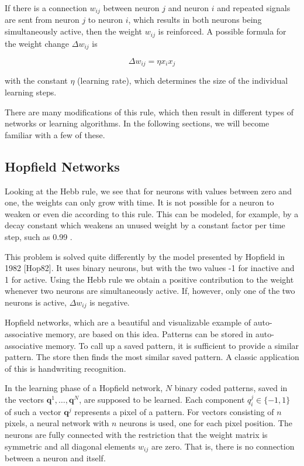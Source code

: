 \documentclass[10pt]{article}
\begin{document}
If there is a connection $w_{i j}$ between neuron $j$ and neuron $i$ and repeated signals are sent from neuron $j$ to neuron $i$, which results in both neurons being simultaneously active, then the weight $w_{i j}$ is reinforced. A possible formula for the weight change $\Delta w_{i j}$ is

$$
\Delta w_{i j}=\eta x_{i} x_{j}
$$

with the constant $\eta$ (learning rate), which determines the size of the individual learning steps.

There are many modifications of this rule, which then result in different types of networks or learning algorithms. In the following sections, we will become familiar with a few of these.

\subsection*{Hopfield Networks}
Looking at the Hebb rule, we see that for neurons with values between zero and one, the weights can only grow with time. It is not possible for a neuron to weaken or even die according to this rule. This can be modeled, for example, by a decay constant which weakens an unused weight by a constant factor per time step, such as 0.99 .

This problem is solved quite differently by the model presented by Hopfield in 1982 [Hop82]. It uses binary neurons, but with the two values -1 for inactive and 1 for active. Using the Hebb rule we obtain a positive contribution to the weight whenever two neurons are simultaneously active. If, however, only one of the two neurons is active, $\Delta w_{i j}$ is negative.

Hopfield networks, which are a beautiful and visualizable example of auto-associative memory, are based on this idea. Patterns can be stored in auto-associative memory. To call up a saved pattern, it is sufficient to provide a similar pattern. The store then finds the most similar saved pattern. A classic application of this is handwriting recognition.

In the learning phase of a Hopfield network, $N$ binary coded patterns, saved in the vectors $\boldsymbol{q}^{1}, \ldots, \boldsymbol{q}^{N}$, are supposed to be learned. Each component $q_{i}^{j} \in\{-1,1\}$ of such a vector $\boldsymbol{q}^{j}$ represents a pixel of a pattern. For vectors consisting of $n$ pixels, a neural network with $n$ neurons is used, one for each pixel position. The neurons are fully connected with the restriction that the weight matrix is symmetric and all diagonal elements $w_{i j}$ are zero. That is, there is no connection between a neuron and itself.
\end{document}
